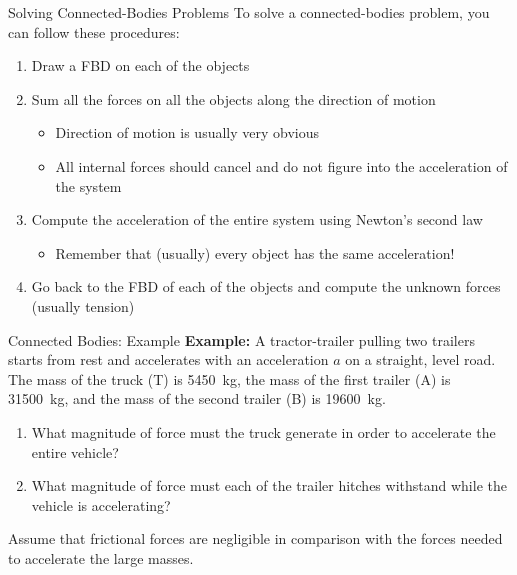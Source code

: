 \documentclass[12pt,compress,aspectratio=169]{beamer}
\begin{document}
\begin{frame}{Solving Connected-Bodies Problems}
  To solve a connected-bodies problem, you can follow these procedures:
  \begin{enumerate}
  \item Draw a FBD on each of the objects
  \item Sum all the forces on all the objects along the direction of motion
    \begin{itemize}
    \item Direction of motion is usually very obvious
    \item All internal forces should cancel and do not figure into the
      acceleration of the system
    \end{itemize}
  \item Compute the acceleration of the entire system using Newton's second law
    \begin{itemize}
    \item Remember that (usually) every object has the same acceleration!
    \end{itemize}
  \item Go back to the FBD of each of the objects and compute the unknown
    forces (usually tension)
  \end{enumerate}
\end{frame}



\begin{frame}{Connected Bodies: Example}
  \textbf{Example:} A tractor-trailer pulling two trailers starts from rest
  and accelerates with an acceleration $a$ on a straight, level road. The mass
  of the truck (T) is \SI{5450}{\kilo\gram}, the mass of the first trailer (A)
  is \SI{31500}{\kilo\gram}, and the mass of the second trailer (B) is
  \SI{19600}{\kilo\gram}.
  \begin{enumerate}
  \item What magnitude of force must the truck generate in order to accelerate
    the entire vehicle?
  \item What magnitude of force must each of the trailer hitches withstand
    while the vehicle is accelerating?
  \end{enumerate}
  Assume that frictional forces are negligible in comparison with the forces
  needed to accelerate the large masses.
\end{frame}
\end{document}
